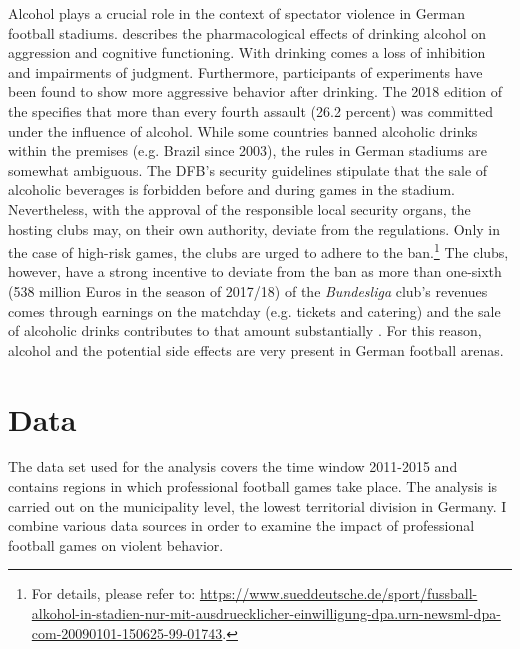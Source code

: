 Alcohol plays a crucial role in the context of spectator violence in German football stadiums. \cite{cook2013virtuous} describes the pharmacological effects of drinking alcohol on aggression and cognitive functioning. With drinking comes a loss of inhibition and impairments of judgment. Furthermore, participants of experiments have been found to show more aggressive behavior after drinking. The 2018 edition of the \citeauthor{PCS2018} specifies that more than every fourth assault (26.2 percent) was committed under the influence of alcohol. While some countries banned alcoholic drinks within the premises (e.g. Brazil since 2003), the rules in German stadiums are somewhat ambiguous. The DFB's security guidelines stipulate that the sale of alcoholic beverages is forbidden before and during games in the stadium. Nevertheless, with the approval of the responsible local security organs, the hosting clubs may, on their own authority, deviate from the regulations. Only in the case of high-risk games, the clubs are urged to adhere to the ban.\footnote{For details, please refer to: \href{https://www.sueddeutsche.de/sport/fussball-alkohol-in-stadien-nur-mit-ausdruecklicher-einwilligung-dpa.urn-newsml-dpa-com-20090101-150625-99-01743}{https://www.sueddeutsche.de/sport/fussball-alkohol-in-stadien-nur-mit-ausdruecklicher-einwilligung-dpa.urn-newsml-dpa-com-20090101-150625-99-01743}.} The clubs, however, have a strong incentive to deviate from the ban as more than one-sixth (538 million Euros in the season of 2017/18) of the \textit{Bundesliga} club's revenues comes through earnings on the matchday (e.g. tickets and catering) and the sale of alcoholic drinks contributes to that amount substantially \citep{deloitte2019report}. For this reason, alcohol and the potential side effects are very present in German football arenas.





\bigskip
\section{Data}\label{sec_soc_ext:data} 
The data set used for the analysis covers the time window 2011-2015 and contains regions in which professional football games take place. The analysis is carried out on the municipality level, the lowest territorial division in Germany. I combine various data sources in order to examine the impact of professional football games on violent behavior.



